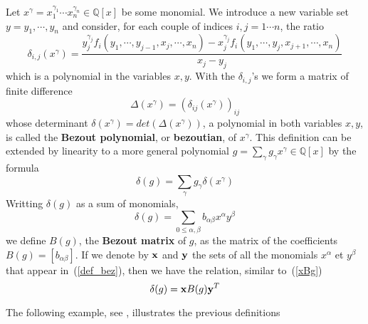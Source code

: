 \documentclass{standalone}
\begin{document}
\begin{defn}
Let $x^\gamma = x_1^{\gamma_1}\cdots x_n^{\gamma_n} \in \mathbb{Q}[x]$ be some monomial.
We introduce a new variable set $y = y_1,\cdots, y_n$ and consider, for each couple of indices $i, j = 1\cdots n$, the ratio
\begin{equation}
\label{finite_diff}
\delta_{i,j}(x^\gamma) = \dfrac{y_j^{\gamma_j}f_i(y_1,\cdots, y_{j-1},x_j,\cdots,x_n) - x_j^{\gamma_j}f_i(y_1,\cdots,y_j,x_{j+1},\cdots,x_n)}{x_j - y_j}
\end{equation}
which is a polynomial in the variables $x, y$. 
With the $\delta_{i,j}$'s we form a matrix of finite difference
\begin{equation}
\label{Delta}
\Delta(x^\gamma) = (\delta_{ij}(x^\gamma))_{ij}
\end{equation}
whose determinant $\delta(x^\gamma) = det(\Delta(x^\gamma))$, a polynomial in both variables $x, y$, is called the {\bf Bezout polynomial}, or {\bf bezoutian}, of $x^\gamma$.
This definition can be extended by linearity to a more general polynomial $g = \sum_\gamma g_\gamma x^\gamma \in \mathbb{Q}[x]$ by the formula
$$\delta(g) = \sum_\gamma g_\gamma \delta(x^\gamma)$$
Writting $\delta(g)$ as a sum of monomials, 
\begin{equation}
\label{def_bez}
\delta(g) = \sum_{0 \le \alpha,\beta} b_{\alpha\beta} x^\alpha y^\beta
\end{equation} 
we define $B(g)$, the {\bf Bezout matrix} of $g$, as the matrix of the coefficients $B(g) = [b_{\alpha\beta}]$. If we denote by $\bold{x}$ and $\bold{y}$ the sets of all the monomials $x^\alpha$ et $y^\beta$ that appear in~(\ref{def_bez}), then we have the relation, similar to~(\ref{xBg})
\begin{equation}
	\delta(g) = \bold{x} B(g) \bold{y}^T
\end{equation}
\end{defn}
The following example, see \cite{jpc}, illustrates the previous definitions
\end{document}
